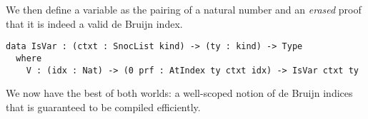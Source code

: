 We then define a variable as the pairing of a natural number and an \emph{erased}
proof that it is indeed a valid de Bruijn index.

\begin{verbatim}
data IsVar : (ctxt : SnocList kind) -> (ty : kind) -> Type
  where
    V : (idx : Nat) -> (0 prf : AtIndex ty ctxt idx) -> IsVar ctxt ty
\end{verbatim}


We now have the best of both worlds: a well-scoped notion of de Bruijn indices
that is guaranteed to be compiled efficiently.

